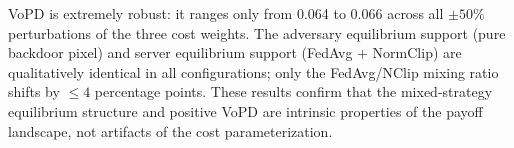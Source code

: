 \documentclass{article}
\begin{document}
VoPD is extremely robust: it ranges only from 0.064 to 0.066 across all $\pm 50\%$ perturbations of the three cost weights. The adversary equilibrium support (pure backdoor pixel) and server equilibrium support (FedAvg + NormClip) are qualitatively identical in all configurations; only the FedAvg/NClip mixing ratio shifts by ${\leq}4$ percentage points. These results confirm that the mixed-strategy equilibrium structure and positive VoPD are intrinsic properties of the payoff landscape, not artifacts of the cost parameterization.
\end{document}
